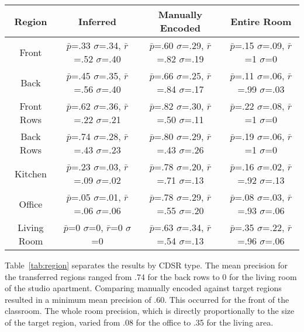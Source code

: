 
\begin{table*}
	\center
\begin{tabular}{|c|c|c|c|}
\hline
Region & Inferred & Manually Encoded & Entire Room \\
\hline
Front & $\bar{p}$=.33 $\sigma$=.34, $\bar{r}$=.52 $\sigma$=.40 & $\bar{p}$=.60 $\sigma$=.29, $\bar{r}$=.82 $\sigma$=.19  & $\bar{p}$=.15 $\sigma$=.09, $\bar{r}$=1 $\sigma$=0  \\
\hline
Back & $\bar{p}$=.45 $\sigma$=.35, $\bar{r}$=.56 $\sigma$=.40 & $\bar{p}$=.66 $\sigma$=.25, $\bar{r}$=.84 $\sigma$=.17  & $\bar{p}$=.11 $\sigma$=.06, $\bar{r}$=.99 $\sigma$=.03  \\
\hline
Front Rows & $\bar{p}$=.62 $\sigma$=.36, $\bar{r}$=.22 $\sigma$=.21 & $\bar{p}$=.82 $\sigma$=.30, $\bar{r}$=.50 $\sigma$=.11  & $\bar{p}$=.22 $\sigma$=.08, $\bar{r}$=1 $\sigma$=0  \\
\hline
Back Rows & $\bar{p}$=.74 $\sigma$=.28, $\bar{r}$=.43 $\sigma$=.23 & $\bar{p}$=.80 $\sigma$=.29, $\bar{r}$=.43 $\sigma$=.26  & $\bar{p}$=.19 $\sigma$=.06, $\bar{r}$=1 $\sigma$=0  \\
\hline
Kitchen & $\bar{p}$=.23 $\sigma$=.03, $\bar{r}$=.09 $\sigma$=.02 & $\bar{p}$=.78 $\sigma$=.20, $\bar{r}$=.71 $\sigma$=.13  & $\bar{p}$=.16 $\sigma$=.02, $\bar{r}$=.92 $\sigma$=.13  \\
\hline
Office & $\bar{p}$=.05 $\sigma$=.01, $\bar{r}$=.06 $\sigma$=.06 & $\bar{p}$=.78 $\sigma$=.29, $\bar{r}$=.55 $\sigma$=.20  & $\bar{p}$=.08 $\sigma$=.03, $\bar{r}$=.93 $\sigma$=.06  \\
\hline
Living Room & $\bar{p}$=0 $\sigma$=0, $\bar{r}$=0 $\sigma$=0 & $\bar{p}$=.63 $\sigma$=.34, $\bar{r}$=.54 $\sigma$=.13  & $\bar{p}$=.35 $\sigma$=.22, $\bar{r}$=.96 $\sigma$=.06  \\
\hline
\end{tabular}
\caption{Performance by Region Type}
  \label{tab:region}	
\end{table*}

Table~\ref{tab:region} separates the results by CDSR type. The mean precision for the transferred regions ranged from .74 for the back rows to 0 for the living room of the studio apartment. Comparing manually encoded against  target regions resulted in a minimum mean precision of .60. This  occurred for the front of the classroom. The whole room precision, which is directly proportionally to the size of the target region, varied from .08 for the office to .35 for the living area. 


